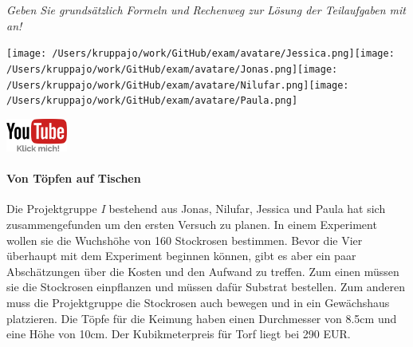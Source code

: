 \documentclass[a4paper, 9pt]{scrartcl}\usepackage[]{graphicx}\usepackage[]{xcolor}
\begin{document}
\textit{Geben Sie grundsätzlich Formeln und Rechenweg zur Lösung der Teilaufgaben mit an!} \\[1Ex]
 

 
\ifcollection
\begin{flushright}
\tiny\vspace{-3Ex}
\textbf{\examinhaltstart}
\exammodulemathstat
\vspace{-4Ex}
\end{flushright}
\begin{minipage}[t]{0.5\textwidth}
\texttt{[image: /Users/kruppajo/work/GitHub/exam/avatare/Jessica.png]}\hspace{-4mm}\texttt{[image: /Users/kruppajo/work/GitHub/exam/avatare/Jonas.png]}\hspace{-4mm}\texttt{[image: /Users/kruppajo/work/GitHub/exam/avatare/Nilufar.png]}\hspace{-4mm}\texttt{[image: /Users/kruppajo/work/GitHub/exam/avatare/Paula.png]}
\end{minipage}
\begin{minipage}[t]{0.5\textwidth}
\hfill
\href{https://youtu.be/57B-yYoFSk0}{\includegraphics[width = 2cm]{img/youtube}}
\end{minipage}
\fi



\ifcollection
\paragraph{Von Töpfen auf Tischen}
\fi



Die Projektgruppe \textit{I} bestehend aus Jonas, Nilufar, Jessica und Paula hat sich zusammengefunden um den ersten Versuch zu planen. In einem Experiment wollen sie die Wuchshöhe von 160 Stockrosen bestimmen. Bevor die Vier überhaupt mit dem Experiment beginnen können, gibt es aber ein paar Abschätzungen über die Kosten und den Aufwand zu treffen. Zum einen müssen sie die Stockrosen einpflanzen und müssen dafür Substrat bestellen. Zum anderen muss die Projektgruppe die Stockrosen auch bewegen und in ein Gewächshaus platzieren. Die Töpfe für die Keimung haben
einen Durchmesser von 8.5cm und eine Höhe von 10cm. Der Kubikmeterpreis für Torf liegt bei 290 EUR.
\end{document}
